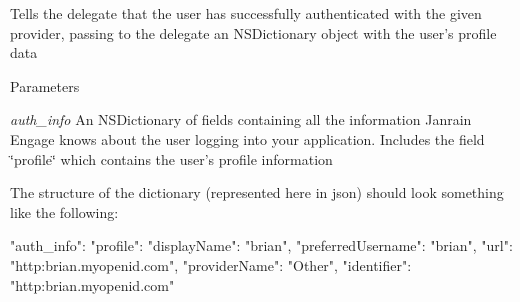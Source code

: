 \label{interfacecom_1_1janrain_1_1android_1_1engage_1_1_j_r_engage_delegate_a589d849b42af1061bac4697ab9982bba}
\label{interfacecom_1_1janrain_1_1android_1_1engage_1_1_j_r_engage_delegate_authDidSucceed}
\hypertarget{interfacecom_1_1janrain_1_1android_1_1engage_1_1_j_r_engage_delegate_authDidSucceed}{}


Tells the delegate that the user has successfully authenticated with the given provider, passing to the delegate an {\ttfamily NSDictionary} object with the user's profile data


\begin{DoxyParams}{Parameters}
\item[{\em auth\_\-info}]An {\ttfamily NSDictionary} of fields containing all the information Janrain Engage knows about the user logging into your application. Includes the field \char`\"{}profile\char`\"{} which contains the user's profile information\end{DoxyParams}
The structure of the dictionary (represented here in json) should look something like the following: 
\begin{DoxyCode}
     "auth_info":
     {
       "profile": 
       {
         "displayName": "brian",
         "preferredUsername": "brian",
         "url": "http:\/\/brian.myopenid.com\/",
         "providerName": "Other",
         "identifier": "http:\/\/brian.myopenid.com\/"
       }
     }
\end{DoxyCode}



